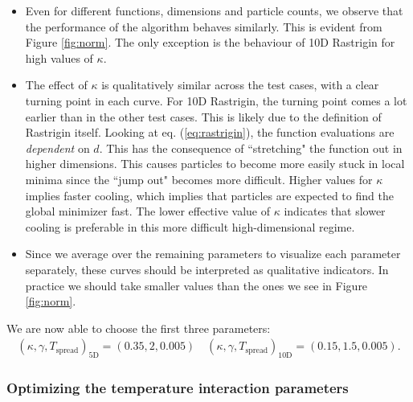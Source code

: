 \documentclass[10pt,a4paper]{article}
\theoremstyle{theorem}
\numberwithin{equation}{section}
\begin{document}
\begin{itemize}
\item Even for different functions, dimensions and particle counts, we observe that the performance of the algorithm behaves similarly. This is evident from Figure \ref{fig:norm}. The only exception is the behaviour of 10D Rastrigin for high values of $\kappa$.

\item The effect of $\kappa$ is qualitatively similar across the test cases, with a clear turning point in each curve. For 10D Rastrigin, the turning point comes a lot earlier than in the other test cases. This is likely due to the definition of Rastrigin itself. Looking at eq. (\ref{eq:rastrigin}), the function evaluations are \textit{dependent} on $d$. This has the consequence of ``stretching" the function out in higher dimensions. This causes particles to become more easily stuck in local minima since the ``jump out" becomes more difficult. Higher values for $\kappa$ implies faster cooling, which implies that particles are expected to find the global minimizer fast. The lower effective value of \(\kappa\) indicates that slower cooling is
preferable in this more difficult high-dimensional regime.

\item Since we average over the remaining parameters to visualize each parameter
separately, these curves should be interpreted as qualitative indicators.
In practice we should take smaller values than the ones we see in Figure \ref{fig:norm}.
\end{itemize}

We are now able to choose the first three parameters:
\begin{align*}
(\kappa,\gamma,T_{\mathrm{spread}})_{5\mathrm{D}}=(0.35,2,0.005) \quad
(\kappa,\gamma,T_{\mathrm{spread}})_{10\mathrm{D}}=(0.15,1.5,0.005).
\end{align*}

\subsubsection{Optimizing the temperature interaction parameters}
\end{document}
